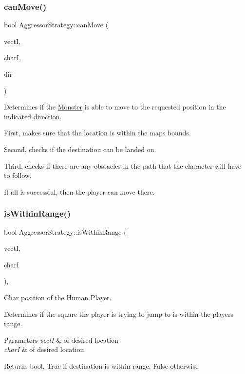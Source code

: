 \subsubsection{\texorpdfstring{can\+Move()}{canMove()}}
{\footnotesize\ttfamily bool Aggressor\+Strategy\+::can\+Move (\begin{DoxyParamCaption}\item[{int}]{vectI,  }\item[{int}]{charI,  }\item[{\hyperlink{_movement_strategy_8h_a0b5e764f0ec9a407e9b8789f0259d754}{Movement\+Direction}}]{dir }\end{DoxyParamCaption})}

Determines if the \hyperlink{class_monster}{Monster} is able to move to the requested position in the indicated direction. 

First, makes sure that the location is within the map\textquotesingle{}s bounds. 

Second, checks if the destination can be landed on. 

Third, checks if there are any obstacles in the path that the character will have to follow. 

If all is successful, then the player can move there. \hypertarget{class_aggressor_strategy_afab4da3199721fd5e4ee20833dd191ef}{}\label{class_aggressor_strategy_afab4da3199721fd5e4ee20833dd191ef} 
\subsubsection{\texorpdfstring{is\+Within\+Range()}{isWithinRange()}}
{\footnotesize\ttfamily bool Aggressor\+Strategy\+::is\+Within\+Range (\begin{DoxyParamCaption}\item[{int}]{vectI,  }\item[{int}]{charI }\end{DoxyParamCaption})\hspace{0.3cm}{\ttfamily [protected]}, {\ttfamily [virtual]}}



Char position of the Human Player. 

Determines if the square the player is trying to jump to is within the player\textquotesingle{}s range. 
\begin{DoxyParams}{Parameters}
{\em vectI} & of desired location \\
\hline
{\em charI} & of desired location \\
\hline
\end{DoxyParams}
\begin{DoxyReturn}{Returns}
bool, True if destination is within range, False otherwise 
\end{DoxyReturn}


